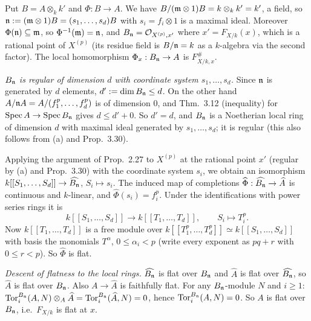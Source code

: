 \documentclass[11pt]{article}
\begin{document}
Put $B=A\otimes_kk'$ and $\Phi:B\to A$. We have $B/(\mathfrak m\otimes1)B=k\otimes_kk'=k'$, a field, so $\mathfrak n:=(\mathfrak m\otimes1)B=(s_1,\dots,s_d)B$ with $s_i=f_i\otimes1$ is a maximal ideal. Moreover $\Phi(\mathfrak n)\subseteq\mathfrak m$, so $\Phi^{-1}(\mathfrak m)=\mathfrak n$, and $B_{\mathfrak n}=\mathcal O_{X^{(p)},x'}$ where $x'=F_{X/k}(x)$, which is a rational point of $X^{(p)}$ (its residue field is $B/\mathfrak n=k$ as a $k$-algebra via the second factor). The local homomorphism $\Phi_x:B_{\mathfrak n}\to A$ is $F^\#_{X/k,x}$.

\emph{$B_{\mathfrak n}$ is regular of dimension $d$ with coordinate system $s_1,\dots,s_d$.} Since $\mathfrak n$ is generated by $d$ elements, $d':=\dim B_{\mathfrak n}\le d$. On the other hand $A/\mathfrak n A=A/(f_1^p,\dots,f_d^p)$ is of dimension $0$, and Thm.~3.12 (inequality) for $\operatorname{Spec}A\to\operatorname{Spec}B_{\mathfrak n}$ gives $d\le d'+0$. So $d'=d$, and $B_{\mathfrak n}$ is a Noetherian local ring of dimension $d$ with maximal ideal generated by $s_1,\dots,s_d$; it is regular (this also follows from (a) and Prop.~3.30).

Applying the argument of Prop.~2.27 to $X^{(p)}$ at the rational point $x'$ (regular by (a) and Prop.~3.30) with the coordinate system $s_i$, we obtain an isomorphism $k[[S_1,\dots,S_d]]\to\widehat{B_{\mathfrak n}}$, $S_i\mapsto s_i$. The induced map of completions $\widehat\Phi:\widehat{B_{\mathfrak n}}\to\widehat A$ is continuous and $k$-linear, and $\widehat\Phi(s_i)=f_i^p$. Under the identifications with power series rings it is
\[ k[[S_1,\dots,S_d]]\to k[[T_1,\dots,T_d]],\qquad S_i\mapsto T_i^p. \]
Now $k[[T_1,\dots,T_d]]$ is a free module over $k[[T_1^p,\dots,T_d^p]]\simeq k[[S_1,\dots,S_d]]$ with basis the monomials $T^\alpha$, $0\le\alpha_i<p$ (write every exponent as $pq+r$ with $0\le r<p$). So $\widehat\Phi$ is flat.

\emph{Descent of flatness to the local rings.} $\widehat{B_{\mathfrak n}}$ is flat over $B_{\mathfrak n}$ and $\widehat A$ is flat over $\widehat{B_{\mathfrak n}}$, so $\widehat A$ is flat over $B_{\mathfrak n}$. Also $A\to\widehat A$ is faithfully flat. For any $B_{\mathfrak n}$-module $N$ and $i\ge1$: $\operatorname{Tor}_i^{B_{\mathfrak n}}(A,N)\otimes_A\widehat A=\operatorname{Tor}_i^{B_{\mathfrak n}}(\widehat A,N)=0$, hence $\operatorname{Tor}_i^{B_{\mathfrak n}}(A,N)=0$. So $A$ is flat over $B_{\mathfrak n}$, i.e.\ $F_{X/k}$ is flat at $x$.
\end{document}
